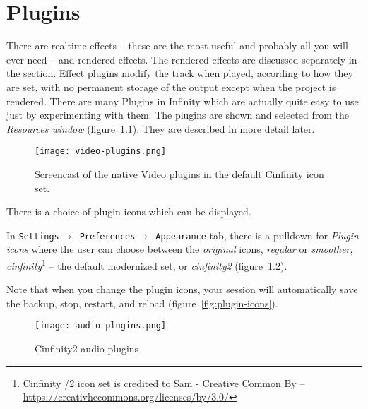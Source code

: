 \chapter{Plugins}%
\label{cha:plugins}

There are realtime effects -- these are the most useful and probably all you will ever need -- and rendered effects.
The rendered effects are discussed separately in the   section.
Effect plugins modify the track when played, according to how they are set, with no permanent storage of the output except when the project is rendered. There are many Plugins in \CGG{} Infinity which are actually quite easy to use just by experimenting with them. The plugins are shown and selected from the \textit{Resources window} (figure~\ref{fig:video-plugins}). They are described in more detail later.

\begin{figure}[htpb]
    \centering
    \texttt{[image: video-plugins.png]}
    \caption{Screencast of the native Video plugins in the default Cinfinity icon set.}
    \label{fig:video-plugins}
\end{figure}

There is a choice of plugin icons which can be displayed.

In \texttt{Settings$\rightarrow$ Preferences$\rightarrow$ Appearance} tab, there is a pulldown for \textit{Plugin icons} where the user can choose between the \textit{original} icons, \textit{regular} or \textit{smoother}, \textit{cinfinity}\protect\footnote{Cinfinity /2 icon set is credited to Sam - Creative Common By -- \url{https://creativhecommons.org/licenses/by/3.0/}} -- the default modernized set, or \textit{cinfinity2} (figure~\ref{fig:audio-plugins}).

Note that when you change the plugin icons, your session will automatically save the backup, stop, restart, and reload (figure~\ref{fig:plugin-icons}).

\begin{figure}[htpb]
    \centering
    \texttt{[image: audio-plugins.png]}
    \caption{Cinfinity2 audio plugins}
    \label{fig:audio-plugins}
\end{figure}

